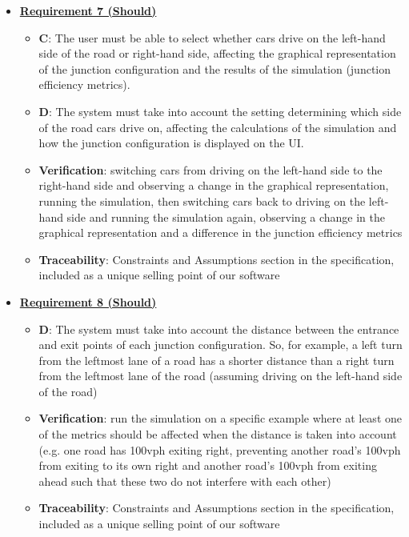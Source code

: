 \documentclass{article}
\begin{document}
\begin{itemize}
    \item \textbf{\underline{Requirement 7 (Should)}}
    \begin{itemize}
        \item \textbf{C}: The user must be able to select whether cars drive on the left-hand side of 
            the road or right-hand side, affecting the graphical representation of the junction
            configuration and the results of the simulation (junction efficiency metrics).
        \item \textbf{D}: The system must take into account the setting determining which side of
            the road cars drive on, affecting the calculations of the simulation and how 
            the junction configuration is displayed on the UI.
        \item \textbf{Verification}: switching cars from driving on the left-hand side to the 
            right-hand side and observing a change in the graphical representation, running 
            the simulation, then switching cars back to driving on the left-hand side and 
            running the simulation again, observing a change in the graphical representation 
            and a difference in the junction efficiency metrics
        \item\textbf{Traceability}: Constraints and Assumptions section in the specification, included 
            as a unique selling point of our software
    \end{itemize}

    \item \textbf{\underline{Requirement 8 (Should)}}
    \begin{itemize}
        \item \textbf{D}: The system must take into account the distance between the entrance and exit 
            points of each junction configuration. So, for example, a left turn from the 
            leftmost lane of a road has a shorter distance than a right turn from the leftmost 
            lane of the road (assuming driving on the left-hand side of the road)
        \item \textbf{Verification}: run the simulation on a specific example where at least one of 
            the metrics should be affected when the distance is taken into account (e.g. one 
            road has 100vph exiting right, preventing another road’s 100vph from exiting to its
            own right and another road’s 100vph from exiting ahead such that these two do not 
            interfere with each other)
        \item\textbf{Traceability}: Constraints and Assumptions section in the specification, included 
            as a unique selling point of our software
    \end{itemize}


\end{itemize}
\end{document}
